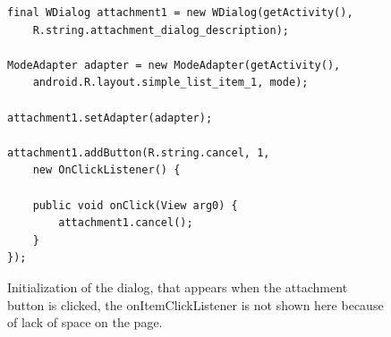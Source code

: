 \begin{figure}[H]
\begin{verbatim}
final WDialog attachment1 = new WDialog(getActivity(),
	R.string.attachment_dialog_description);

ModeAdapter adapter = new ModeAdapter(getActivity(),
	android.R.layout.simple_list_item_1, mode);

attachment1.setAdapter(adapter);

attachment1.addButton(R.string.cancel, 1,
	new OnClickListener() {

	public void onClick(View arg0) {
		attachment1.cancel();
	}
});
\end{verbatim}
\caption{Initialization of the dialog, that appears when the attachment button is clicked, the onItemClickListener is not shown here because of lack of space on the page.}%
\label{code:customize:wdialog}%
\end{figure}